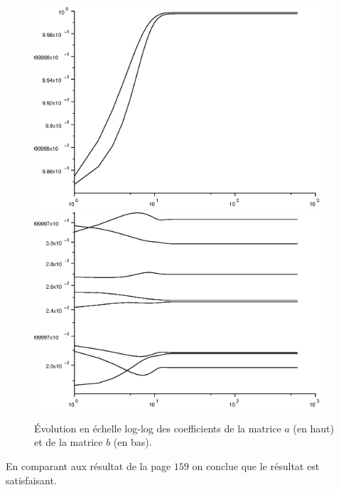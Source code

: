\documentclass[12pt,a4paper]{article}
\begin{document}
\begin{figure}[H]
	\centering
	\includegraphics[width=0.95\textwidth]{images/figure7.eps} \\
	\includegraphics[width=0.95\textwidth]{images/figure8.eps}
	\caption{Évolution en échelle log-log des coefficients de la matrice $a$ (en haut) et de la matrice $b$ (en bas).}
\end{figure}

En comparant aux résultat de la page $159$ on conclue que le résultat est satisfaisant.
\end{document}
